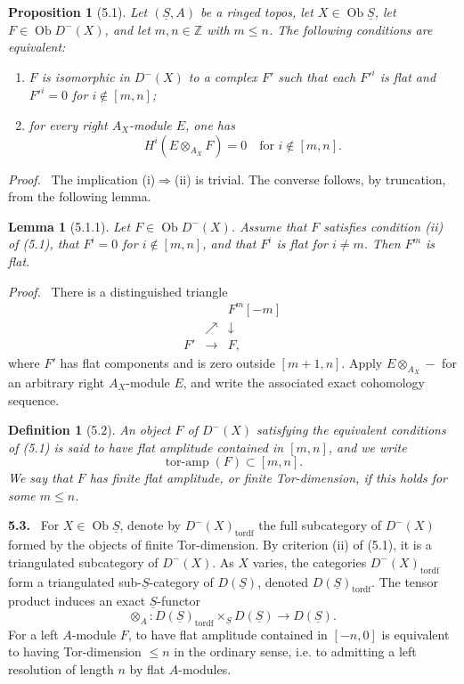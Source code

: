 \documentclass[11pt]{article}
\theoremstyle{plain}
\newtheorem*{proposition*}{Proposition}
\newtheorem*{lemma*}{Lemma}
\newtheorem*{definition*}{Definition}
\theoremstyle{definition}
\theoremstyle{remark}
\newenvironment{statement}[1]{\par\medskip\noindent\textbf{#1.}\ }{\par\medskip}
\newenvironment{prooftext}{\par\noindent\textit{Proof.}\ }{\par\medskip}
\newcommand{\ZZ}{\mathbb Z}
\DeclareMathOperator{\ob}{Ob}
\providecommand{\uS}{\underline{S}}
\begin{document}
\begin{proposition*}[5.1]
Let $(\uS,A)$ be a ringed topos, let $X\in\ob\uS$, let $F\in\ob D^-(X)$, and let $m,n\in\ZZ$ with $m\leq n$. The following conditions are equivalent:
\begin{enumerate}[label=(\roman*)]
\item $F$ is isomorphic in $D^-(X)$ to a complex $F'$ such that each $F'^i$ is flat and $F'^i=0$ for $i\notin[m,n]$;
\item for every right $A_X$-module $E$, one has
\[
H^i(E\otimes_{A_X}F)=0\quad\text{for }i\notin[m,n].
\]
\end{enumerate}
\end{proposition*}

\begin{prooftext}
The implication (i)$\Rightarrow$(ii) is trivial. The converse follows, by truncation, from the following lemma.
\end{prooftext}

\begin{lemma*}[5.1.1]
Let $F\in\ob D^-(X)$. Assume that $F$ satisfies condition (ii) of (5.1), that $F^i=0$ for $i\notin[m,n]$, and that $F^i$ is flat for $i\ne m$. Then $F^m$ is flat.
\end{lemma*}

\begin{prooftext}
There is a distinguished triangle
\[
\begin{array}{ccc}
&&F^m[-m]\\
&\nearrow&\downarrow\\
F'&\longrightarrow&F,
\end{array}
\]
where $F'$ has flat components and is zero outside $[m+1,n]$. Apply $E\otimes_{A_X}-$ for an arbitrary right $A_X$-module $E$, and write the associated exact cohomology sequence.
\end{prooftext}

\begin{definition*}[5.2]
An object $F$ of $D^-(X)$ satisfying the equivalent conditions of (5.1) is said to have \emph{flat amplitude} contained in $[m,n]$, and we write
\[
\operatorname{tor\text{-}amp}(F)\subset[m,n].
\]
We say that $F$ has finite flat amplitude, or finite Tor-dimension, if this holds for some $m\leq n$.
\end{definition*}

\begin{statement}{5.3}
For $X\in\ob\uS$, denote by $D^-(X)_{\mathrm{tordf}}$ the full subcategory of $D^-(X)$ formed by the objects of finite Tor-dimension. By criterion (ii) of (5.1), it is a triangulated subcategory of $D^-(X)$. As $X$ varies, the categories $D^-(X)_{\mathrm{tordf}}$ form a triangulated sub-$\uS$-category of $D(\uS)$, denoted $D(\uS)_{\mathrm{tordf}}$. The tensor product induces an exact $\uS$-functor
\[
\otimes_A:D(\uS)_{\mathrm{tordf}}\times_{\uS}D(\uS)
\longrightarrow D(\uS).
\]
For a left $A$-module $F$, to have flat amplitude contained in $[-n,0]$ is equivalent to having Tor-dimension $\leq n$ in the ordinary sense, i.e. to admitting a left resolution of length $n$ by flat $A$-modules.
\end{statement}
\end{document}
